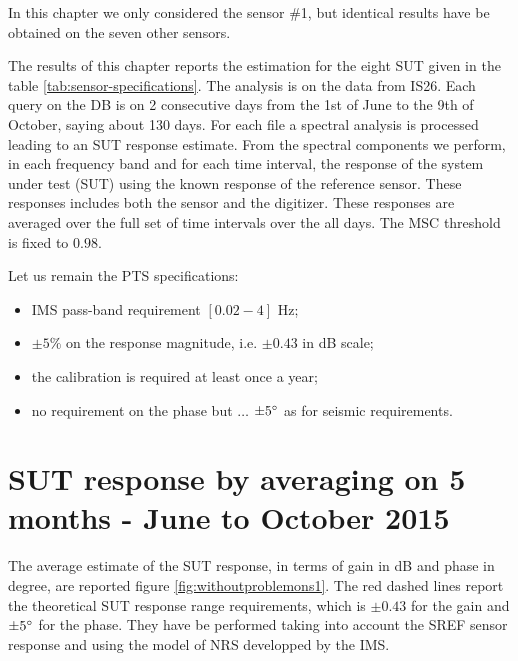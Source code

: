 
In this chapter we only considered the sensor \#1, but identical results have be obtained on the seven other sensors.

The results of this chapter reports the estimation for the eight SUT given in the table \ref{tab:sensor-specifications}.
The analysis is on the data from IS26. Each query on the DB is on 2 consecutive days from the 1st of June to the 9th of October, saying about 130 days. For each file a spectral analysis is processed leading to an SUT response estimate. From the spectral components we perform, in each frequency band and for each time interval, the response of the system under test (SUT) using the known response of the reference sensor. These responses includes both the sensor and the digitizer. These responses are averaged over the full set of time intervals over the all days. The  MSC threshold is fixed to $0.98$. 

Let us remain the PTS specifications:
\begin{itemize}
\item
IMS pass-band requirement $[0.02 - 4]$ Hz;
 \item
$\pm 5\%$ on the response magnitude, i.e. $\pm 0.43$ in dB scale;
\item
the calibration is required at least once a year;
 \item
no requirement  on the phase but $\ldots$ $\pm 5^{\circ}$ as for seismic requirements.
\end{itemize}


\section{SUT response by averaging on 5 months - June to October 2015}
The average estimate of the SUT response, in terms of gain in dB and phase in degree, are reported figure \ref{fig:withoutproblemons1}. The red dashed lines report the theoretical SUT response range requirements, which is $\pm 0.43$ for the gain and $\pm 5^{\circ}$ for the phase. They have be performed taking into account the SREF sensor response and using the model of NRS developped by the IMS.

